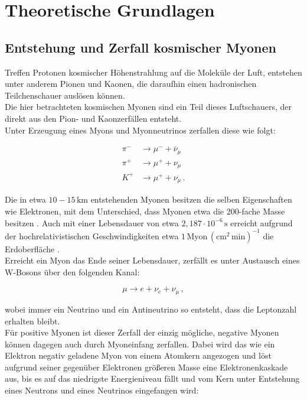 \section{Theoretische Grundlagen}
\label{sec:theorie}

\subsection{Entstehung und Zerfall kosmischer Myonen}

Treffen Protonen kosmischer Höhenstrahlung auf die Moleküle der Luft, entstehen unter anderem Pionen und Kaonen, die daraufhin einen hadronischen Teilchenschauer auslösen können. \\
Die hier betrachteten kosmischen Myonen sind ein Teil dieses Luftschauers, der direkt aus den Pion- und Kaonzerfällen entsteht. \\

Unter Erzeugung eines Myons und Myonneutrinos zerfallen diese wie folgt:

\begin{align*}
    \pi^- &\rightarrow \mu^- + \bar{\nu}_\mu \\
    \pi^+ &\rightarrow \mu^+ + \nu_\mu \\
    K^+ &\rightarrow \mu^+ + \nu_\mu \,.
\end{align*}

Die in etwa $10 - 15 \,\unit{\kilo\meter}$ \cite{grup} entstehenden Myonen besitzen die selben Eigenschaften wie Elektronen, mit dem Unterschied, dass Myonen etwa die 200-fache Masse \cite{pdg} besitzen .
Auch mit einer Lebensdauer von etwa $2,187 \cdot 10^{-6} \,\unit{\second}$ \cite{pdg} erreicht aufgrund der hochrelativistischen Geschwindigkeiten etwa 
$1 \,\text{Myon} \, (\unit{\centi\meter}^2 \, \unit{\minute})^{-1}$ die Erdoberfläche \cite{grup}. \\

Erreicht ein Myon das Ende seiner Lebensdauer, zerfällt es unter Austausch eines W-Bosons über den folgenden Kanal:

\begin{equation*}
    \mu \rightarrow e + \nu_e + \nu_\mu \,,
\end{equation*}

wobei immer ein Neutrino und ein Antineutrino so entsteht, dass die Leptonzahl erhalten bleibt. \\
Für positive Myonen ist dieser Zerfall der einzig mögliche, negative Myonen können dagegen auch durch Myoneinfang zerfallen.
Dabei wird das wie ein Elektron negativ geladene Myon von einem Atomkern angezogen und löst aufgrund seiner gegenüber Elektronen größeren Masse eine Elektronenkaskade aus,
bis es auf das niedrigste Energieniveau fällt und vom Kern unter Entstehung eines Neutrons und eines Neutrinos eingefangen wird:

